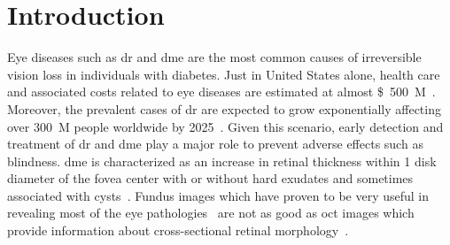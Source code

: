 \graphicspath{ {./content/intro/figures/} }

\section*{Introduction}
\label{sec:intro}  %

Eye diseases such as \gls{dr} and \gls{dme} are the most common causes of irreversible vision loss in individuals with diabetes.
Just in United States alone, health care and associated costs related to eye diseases are estimated at almost \SI{500}[\$]{M}~\cite{Sharma2005}.
Moreover, the prevalent cases of \gls{dr} are expected to grow exponentially affecting over \SI{300}{M} people worldwide by 2025~\cite{Wild2004}.
Given this scenario, early detection and treatment of \gls{dr} and \gls{dme} play a major role to prevent adverse effects such as blindness.
\gls{dme} is characterized as an increase in retinal thickness within 1 disk diameter of the fovea center with or without hard exudates and sometimes associated with cysts~\cite{ETDRSG1985}.
Fundus images which have proven to be very useful in revealing most of the eye pathologies~\cite{Mookiah20132136,Trucco2013} are not as good as \gls{oct} images which provide information about cross-sectional retinal morphology~\cite{Wang2015}.  

